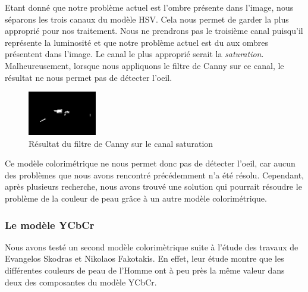 Etant donné que notre problème actuel est l'ombre présente dans l'image, nous séparons les trois canaux du modèle HSV. Cela
nous permet de garder la plus approprié pour nos traitement. Nous ne prendrons pas le troisième canal puisqu'il représente 
la luminosité et que notre problème actuel est du aux ombres présentent dans l'image. Le canal le plus approprié serait la \textit{saturation}. 
Malheureusement, lorsque nous appliquons le filtre de Canny sur ce canal, le résultat ne nous permet pas de détecter l'oeil.

\begin{figure}[H]
 \center
 \includegraphics[width=3cm]{image/cannySaturation.png}
 \caption{Résultat du filtre de Canny sur le canal saturation}
\end{figure}

Ce modèle colorimétrique ne nous permet donc pas de détecter l'oeil, car aucun des problèmes que nous avons rencontré
précédemment n'a été résolu. Cependant, après plusieurs recherche, nous avons trouvé une solution qui pourrait résoudre
le problème de la couleur de peau grâce à un autre modèle colorimétrique.

\subsubsection{Le modèle YCbCr}

Nous avons testé un second modèle colorimètrique suite à l'étude des travaux de Evangelos Skodras et Nikolaos Fakotakis\cite{Skodras_2012ieee}.
En effet, leur étude montre que les différentes couleurs de peau de l'Homme ont à peu près la même valeur dans deux des
composantes du modèle YCbCr.\\

